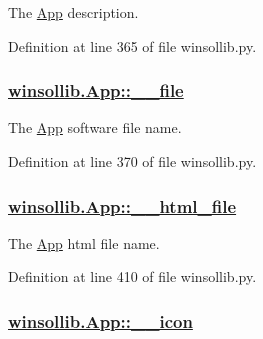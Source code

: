 The \hyperlink{classwinsollib_1_1App}{App} description. 



Definition at line 365 of file winsollib.py.\hypertarget{classwinsollib_1_1App_990bdcf7f9b5aca225afcf2f51d8a89a}{
\subsubsection[\_\-\_\-file]{\setlength{\rightskip}{0pt plus 5cm}\hyperlink{classwinsollib_1_1App_990bdcf7f9b5aca225afcf2f51d8a89a}{winsollib.App::\_\-\_\-file}}}
\label{classwinsollib_1_1App_990bdcf7f9b5aca225afcf2f51d8a89a}


The \hyperlink{classwinsollib_1_1App}{App} software file name. 



Definition at line 370 of file winsollib.py.\hypertarget{classwinsollib_1_1App_487c1a60b7223a7c5e1d43cb7ad2ab90}{
\subsubsection[\_\-\_\-html\_\-file]{\setlength{\rightskip}{0pt plus 5cm}\hyperlink{classwinsollib_1_1App_487c1a60b7223a7c5e1d43cb7ad2ab90}{winsollib.App::\_\-\_\-html\_\-file}}}
\label{classwinsollib_1_1App_487c1a60b7223a7c5e1d43cb7ad2ab90}


The \hyperlink{classwinsollib_1_1App}{App} html file name. 



Definition at line 410 of file winsollib.py.\hypertarget{classwinsollib_1_1App_985fae142ceb59f18d79374b0752e47e}{
\subsubsection[\_\-\_\-icon]{\setlength{\rightskip}{0pt plus 5cm}\hyperlink{classwinsollib_1_1App_985fae142ceb59f18d79374b0752e47e}{winsollib.App::\_\-\_\-icon}}}
\label{classwinsollib_1_1App_985fae142ceb59f18d79374b0752e47e}


